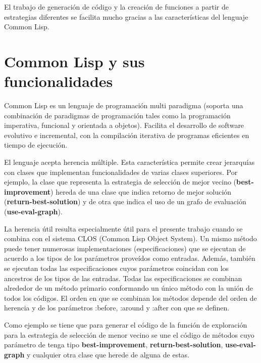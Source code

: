 El trabajo de generación de código y la creación de funciones a partir de estrategias diferentes se facilita mucho gracias a las características del lenguaje Common Lisp.

\section{Common Lisp y sus funcionalidades}\label{2-Lisp}
Common Lisp es un lenguaje de programación multi paradigma (soporta una combinación de paradigmas de programación tales como la programación imperativa, funcional y orientada a objetos). Facilita el desarrollo de software evolutivo e incremental, con la compilación iterativa de programas eficientes en tiempo de ejecución.

El lenguaje acepta herencia múltiple. Esta característica permite crear jerarquías con clases que implementan funcionalidades de varias clases superiores. Por ejemplo, la clase que representa la estrategia de selección de mejor vecino (\textbf{best-improvement}) hereda de una clase que indica  retorno de mejor solución (\textbf{return-best-solution}) y de otra que indica el uso de un grafo de evaluación (\textbf{use-eval-graph}).

La herencia útil resulta especialmente útil para el presente trabajo cuando se combina con el sistema CLOS (Common Lisp Object System). Un mismo método puede tener numerosas implementaciones (especificaciones) que se ejecutan de acuerdo a los tipos de los parámetros proveídos como entradas. Además, también se ejecutan todas las especificaciones cuyos parámetros coincidan con los ancestros de los tipos de las entradas. Todas las especificaciones se combinan alrededor de un método primario conformando un único método con la unión de todos los códigos. El orden en que se combinan los métodos depende del orden de herencia y de los parámetros :before, :around y :after con que se definen.

Como ejemplo se tiene que para generar el código de la función de exploración para la estrategia de selección de menor vecino se une el código de métodos cuyo parámetro de  tenga tipo \textbf{best-improvement}, \textbf{return-best-solution}, \textbf{use-eval-graph} y cualquier otra clase que herede de alguna de estas.



























